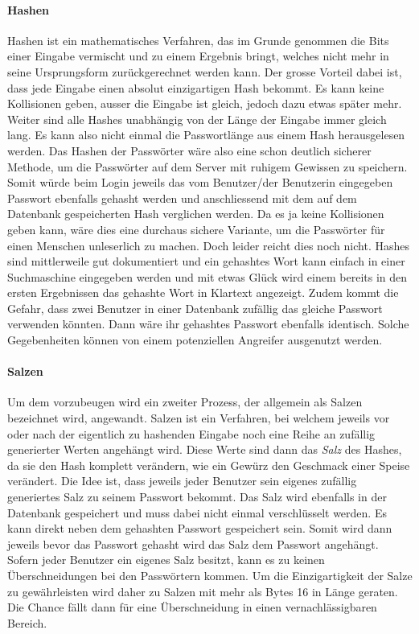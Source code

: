 \documentclass[../main.tex]{subfiles}
\begin{document}
	\paragraph{Hashen}
	Hashen ist ein mathematisches Verfahren, das im Grunde genommen die Bits einer Eingabe vermischt und zu einem Ergebnis bringt, welches nicht mehr in seine Ursprungsform zurückgerechnet werden kann. Der grosse Vorteil dabei ist, dass jede Eingabe einen absolut einzigartigen Hash bekommt. Es kann keine Kollisionen geben, ausser die Eingabe ist gleich, jedoch dazu etwas später mehr. Weiter sind alle Hashes unabhängig von der Länge der Eingabe immer gleich lang. Es kann also nicht einmal die Passwortlänge aus einem Hash herausgelesen werden. Das Hashen der Passwörter wäre also eine schon deutlich sicherer Methode, um die Passwörter auf dem Server mit ruhigem Gewissen zu speichern. Somit würde beim Login jeweils das vom Benutzer/der Benutzerin eingegeben Passwort ebenfalls gehasht werden und anschliessend mit dem auf dem Datenbank gespeicherten Hash verglichen werden. Da es ja keine Kollisionen geben kann, wäre dies eine durchaus sichere Variante, um die Passwörter für einen Menschen unleserlich zu machen. Doch leider reicht dies noch nicht. Hashes sind mittlerweile gut dokumentiert und ein gehashtes Wort kann einfach in einer Suchmaschine eingegeben werden und mit etwas Glück wird einem bereits in den ersten Ergebnissen das gehashte Wort in Klartext angezeigt. Zudem kommt die Gefahr, dass zwei Benutzer in einer Datenbank zufällig das gleiche Passwort verwenden könnten. Dann wäre ihr gehashtes Passwort ebenfalls identisch. Solche Gegebenheiten können von einem potenziellen Angreifer ausgenutzt werden. 
	
	\paragraph{Salzen}
	Um dem vorzubeugen wird ein zweiter Prozess, der allgemein als Salzen bezeichnet wird, angewandt. Salzen ist ein Verfahren, bei welchem jeweils vor oder nach der eigentlich zu hashenden Eingabe noch eine Reihe an zufällig generierter Werten angehängt wird. Diese Werte sind dann das \emph{Salz} des Hashes, da sie den Hash komplett verändern, wie ein Gewürz den Geschmack einer Speise verändert. Die Idee ist, dass jeweils jeder Benutzer sein eigenes zufällig generiertes Salz zu seinem Passwort bekommt. Das Salz wird ebenfalls in der Datenbank gespeichert und muss dabei nicht einmal verschlüsselt werden. Es kann direkt neben dem gehashten Passwort gespeichert sein. Somit wird dann jeweils bevor das Passwort gehasht wird das Salz dem Passwort angehängt. Sofern jeder Benutzer ein eigenes Salz besitzt, kann es zu keinen Überschneidungen bei den Passwörtern kommen. Um die Einzigartigkeit der Salze zu gewährleisten wird daher zu Salzen mit mehr als Bytes 16 in Länge geraten. Die Chance fällt dann für eine Überschneidung in einen vernachlässigbaren Bereich. 
	
\end{document}
